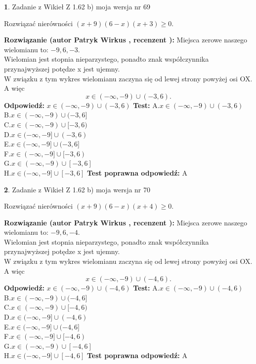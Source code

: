 \documentclass[12pt, a4paper]{article}
\theoremstyle{definition} %
\newtheorem{zad}{}
\newcommand{\zadStart}[1]{\begin{zad}#1\newline}
\newcommand{\zadStop}{\end{zad}}
\newcommand{\rozwStart}[2]{\noindent \textbf{Rozwiązanie (autor #1 , recenzent #2): }\newline}
\newcommand{\rozwStop}{\newline}
\newcommand{\odpStart}{\noindent \textbf{Odpowiedź:}\newline}
\newcommand{\odpStop}{\newline}
\newcommand{\testStart}{\noindent \textbf{Test:}\newline}
\newcommand{\testStop}{\newline}
\newcommand{\kluczStart}{\noindent \textbf{Test poprawna odpowiedź:}\newline}
\newcommand{\kluczStop}{\newline}
\begin{document}
\zadStart{Zadanie z Wikieł Z 1.62 b) moja wersja nr 69}

Rozwiązać nierówności $(x+9)(6-x)(x+3)\ge0$.
\zadStop
\rozwStart{Patryk Wirkus}{}
Miejsca zerowe naszego wielomianu to: $-9, 6, -3$.\\
Wielomian jest stopnia nieparzystego, ponadto znak współczynnika przy\linebreak najwyższej potędze x jest ujemny.\\ W związku z tym wykres wielomianu zaczyna się od lewej strony powyżej osi OX. A więc $$x \in (-\infty,-9) \cup (-3,6).$$
\rozwStop
\odpStart
$x \in (-\infty,-9) \cup (-3,6)$
\odpStop
\testStart
A.$x \in (-\infty,-9) \cup (-3,6)$\\
B.$x \in (-\infty,-9) \cup (-3,6]$\\
C.$x \in (-\infty,-9) \cup [-3,6)$\\
D.$x \in (-\infty,-9] \cup (-3,6)$\\
E.$x \in (-\infty,-9] \cup (-3,6]$\\
F.$x \in (-\infty,-9] \cup [-3,6)$\\
G.$x \in (-\infty,-9) \cup [-3,6]$\\
H.$x \in (-\infty,-9] \cup [-3,6]$
\testStop
\kluczStart
A
\kluczStop



\zadStart{Zadanie z Wikieł Z 1.62 b) moja wersja nr 70}

Rozwiązać nierówności $(x+9)(6-x)(x+4)\ge0$.
\zadStop
\rozwStart{Patryk Wirkus}{}
Miejsca zerowe naszego wielomianu to: $-9, 6, -4$.\\
Wielomian jest stopnia nieparzystego, ponadto znak współczynnika przy\linebreak najwyższej potędze x jest ujemny.\\ W związku z tym wykres wielomianu zaczyna się od lewej strony powyżej osi OX. A więc $$x \in (-\infty,-9) \cup (-4,6).$$
\rozwStop
\odpStart
$x \in (-\infty,-9) \cup (-4,6)$
\odpStop
\testStart
A.$x \in (-\infty,-9) \cup (-4,6)$\\
B.$x \in (-\infty,-9) \cup (-4,6]$\\
C.$x \in (-\infty,-9) \cup [-4,6)$\\
D.$x \in (-\infty,-9] \cup (-4,6)$\\
E.$x \in (-\infty,-9] \cup (-4,6]$\\
F.$x \in (-\infty,-9] \cup [-4,6)$\\
G.$x \in (-\infty,-9) \cup [-4,6]$\\
H.$x \in (-\infty,-9] \cup [-4,6]$
\testStop
\kluczStart
A
\kluczStop
\end{document}
